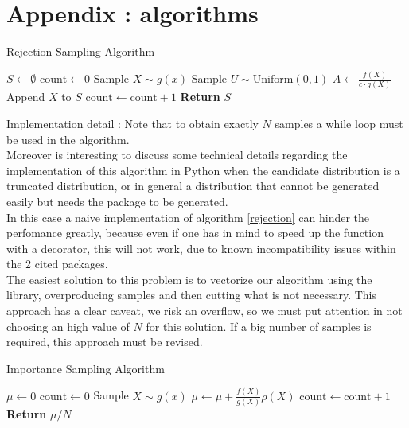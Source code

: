 \chapter*{Appendix : algorithms}

\begin{algorithm}
    \caption{Rejection Sampling Algorithm}
    \begin{algorithmic}[1]
    \State \( S \leftarrow \emptyset \)
    \State \( \text{count} \leftarrow 0 \)
        \State Sample \( X \sim g(x) \) 
        \State Sample \( U \sim \text{Uniform}(0, 1) \) 
        \State \( A \leftarrow \frac{f(X)}{c \cdot g(X)} \) 
            \State Append \( X \) to \( S \)
            \State \( \text{count} \leftarrow \text{count} + 1 \)
        \EndIf
    \EndWhile
    \State \textbf{Return} \( S \)
    \end{algorithmic}
    \label{rejection}
    \end{algorithm}
    
\label{par:detail_rejection}  
Implementation detail : Note that to obtain exactly $N$ samples a while loop must be used in the algorithm. \\
Moreover is interesting to discuss some technical details regarding the implementation of this algorithm in Python when the candidate
distribution is a truncated distribution, or in general a distribution that cannot be generated easily but needs the  package
to be generated.\\
In this case a naive implementation of algorithm \ref{rejection} can hinder the perfomance greatly, because even if one has in mind to speed
up the function with a  decorator, this will not work, due to known incompatibility issues within the 2 cited packages. \\
The easiest solution to this problem is to vectorize our algorithm using the  library, overproducing samples 
and then cutting what is not necessary. This approach has a clear caveat, we risk an  overflow, so we must put attention
in not choosing an high value of $N$ for this solution. If a big number of samples is required, this approach must be revised.

  \begin{algorithm}
    \caption{Importance Sampling Algorithm}
    \begin{algorithmic}[1]
    \State \( \mu \leftarrow 0 \) 
    \State \( \text{count} \leftarrow 0 \)
        \State Sample \( X \sim g(x) \) 
        \State \( \mu \leftarrow \mu + \frac{f(X)}{g(X)}\rho(X) \)
        \State \( \text{count} \leftarrow \text{count} + 1 \)
    \EndWhile
    \State \textbf{Return} \( \mu / N \) 
    \end{algorithmic}
    \label{importance_sampling}
\end{algorithm}